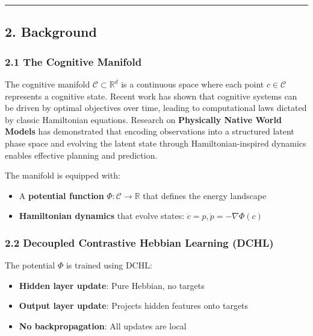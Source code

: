 \documentclass[
  11pt,
  a4paper,
]{article}
\providecommand{\tightlist}{%
  \setlength{\itemsep}{0pt}\setlength{\parskip}{0pt}}
\begin{document}
\begin{center}\rule{0.5\linewidth}{0.5pt}\end{center}

\subsection{2. Background}\label{background}

\subsubsection{2.1 The Cognitive Manifold}\label{the-cognitive-manifold}

The cognitive manifold \(\mathcal{C} \subset \mathbb{R}^d\) is a
continuous space where each point \(c \in \mathcal{C}\) represents a
cognitive state. Recent work has shown that cognitive systems can be
driven by optimal objectives over time, leading to computational laws
dictated by classic Hamiltonian equations. Research on
\textbf{Physically Native World Models} has demonstrated that encoding
observations into a structured latent phase space and evolving the
latent state through Hamiltonian-inspired dynamics enables effective
planning and prediction.

The manifold is equipped with:

\begin{itemize}
\tightlist
\item
  A \textbf{potential function} \(\Phi: \mathcal{C} \to \mathbb{R}\)
  that defines the energy landscape
\item
  \textbf{Hamiltonian dynamics} that evolve states:
  \(\dot{c} = p, \dot{p} = -\nabla\Phi(c)\)
\end{itemize}

\subsubsection{2.2 Decoupled Contrastive Hebbian Learning
(DCHL)}\label{decoupled-contrastive-hebbian-learning-dchl}

The potential \(\Phi\) is trained using DCHL:

\begin{itemize}
\tightlist
\item
  \textbf{Hidden layer update}: Pure Hebbian, no targets
\item
  \textbf{Output layer update}: Projects hidden features onto targets
\item
  \textbf{No backpropagation}: All updates are local
\end{itemize}
\end{document}
